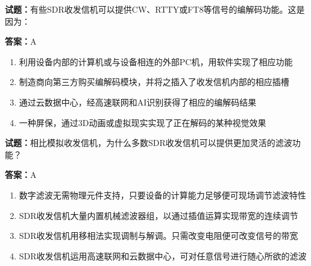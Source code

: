 \documentclass{ctexbook}
\begin{document}




\vspace{1em}

\textbf{试题：}有些SDR收发信机可以提供CW、RTTY或FT8等信号的编解码功能。这是因为： 

\textbf{答案：}A 

\begin{enumerate}[leftmargin=3em]
  \item 利用设备内部的计算机或与设备相连的外部PC机，用软件实现了相应功能 

  \item 制造商向第三方购买编解码模块，并将之插入了收发信机内部的相应插槽 

  \item 通过云数据中心，经高速联网和AI识别获得了相应的编解码结果 

  \item 一种屏保，通过3D动画或虚拟现实实现了正在解码的某种视觉效果 

\end{enumerate}






\vspace{1em}

\textbf{试题：}相比模拟收发信机，为什么多数SDR收发信机可以提供更加灵活的滤波功能？ 

\textbf{答案：}A 

\begin{enumerate}[leftmargin=3em]
  \item 数字滤波无需物理元件支持，只要设备的计算能力足够便可现场调节滤波特性 

  \item SDR收发信机大量内置机械滤波器组，以通过插值运算实现带宽的连续调节 

  \item SDR收发信机用移相法实现调制与解调。只需改变电阻便可改变信号的带宽 

  \item SDR收发信机运用高速联网和云数据中心，可对任意信号进行随心所欲的滤波 

\end{enumerate}




\end{document}
